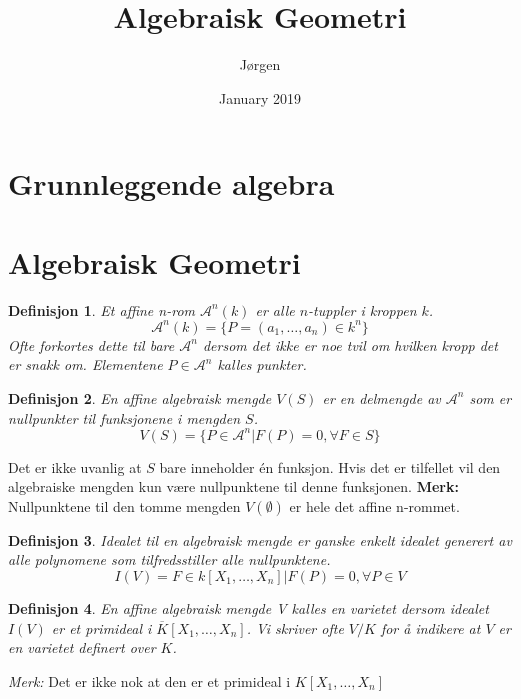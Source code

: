 \documentclass{article}
\title{Algebraisk Geometri}
\author{Jørgen }
\date{January 2019}
\newtheorem{definisjon}{Definisjon}[section]
\begin{document}
\maketitle

\section{Grunnleggende algebra}

\section{Algebraisk Geometri}
\begin{definisjon}
Et affine n-rom $\mathcal{A}^n(k)$ er alle $n$-tuppler i kroppen $k$. 
\begin{equation*}
    \mathcal{A}^n(k) = \{P = (a_1, \ldots, a_n) \in k^n \}
\end{equation*}
Ofte forkortes dette til bare $\mathcal{A}^n$ dersom det ikke er noe tvil om hvilken kropp det er snakk om. Elementene $P \in \mathcal{A}^n$ kalles punkter.
\end{definisjon}
\begin{definisjon}En affine algebraisk mengde $V(S)$ er en delmengde av $\mathcal{A}^n$ som er nullpunkter til funksjonene i mengden $S$. 
\begin{equation*}
 V(S) = \{P \in \mathcal{A}^n | F(P) = 0, \forall F \in S\}   
\end{equation*}
\end{definisjon}
Det er ikke uvanlig at $S$ bare inneholder én funksjon. Hvis det er tilfellet vil den algebraiske mengden kun være nullpunktene til denne funksjonen. \textbf{Merk:} Nullpunktene til den tomme mengden $V(\emptyset)$ er hele det affine n-rommet. 
\begin{definisjon}
Idealet til en algebraisk mengde er ganske enkelt idealet generert av alle polynomene som tilfredsstiller alle nullpunktene.
\begin{equation*}
    I(V) = {F \in k[X_1, \ldots, X_n] | F(P) = 0, \forall P \in V}
\end{equation*}
\end{definisjon}
\begin{definisjon}En affine algebraisk mengde V kalles en \textit{varietet} dersom idealet $I(V)$ er et primideal i $\overline{K}[X_1, \ldots, X_n]$. Vi skriver ofte $V/K$ for å indikere at $V$ er en varietet definert over $K$.
\end{definisjon}
\textit{Merk:} Det er ikke nok at den er et primideal i $K[X_1, \ldots, X_n]$
\end{document}
